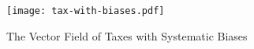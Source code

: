 
\begin{landscape}
 \begin{figure}[htbp]
	\begin{center}
	\texttt{[image: tax-with-biases.pdf]}
	\caption[The Vector Field of Taxes with Systematic Biases]{The Vector Field of Taxes with Systematic Biases}
	\label{fig:tax-with-biases}
	\end{center}
	
\end{figure}
\end{landscape}







